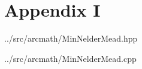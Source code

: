 \documentclass[11pt,oneside]{extarticle}
\begin{document}
\section{Appendix I}

\begingroup
{}\selectfont

{../src/arcmath/MinNelderMead.hpp}
\endgroup

\begingroup
{}\selectfont
\lstset{language=c++,
    showstringspaces=false
}

{../src/arcmath/MinNelderMead.cpp}
\endgroup
\end{document}
